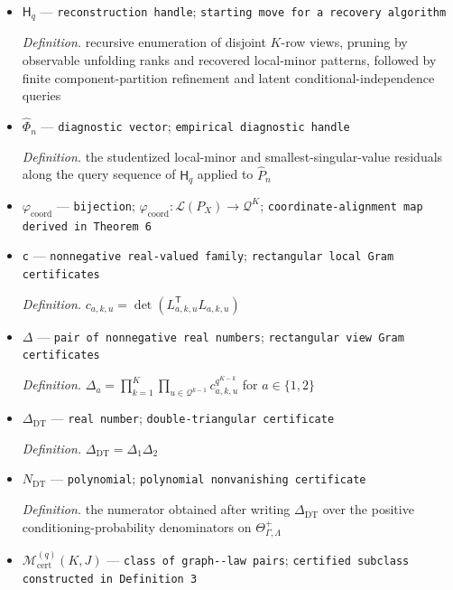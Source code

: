 \documentclass{article}
\begin{document}
\begin{itemize}
  \par\smallskip\noindent\emph{Definition.} \(d_{a,k,u}=\det(B_{a,k,u})\) when \(m_{s(a,k)}=q\)
  \item \(\mathsf H_q\) --- \texttt{reconstruction handle}; \texttt{starting move for a recovery algorithm}
  \par\smallskip\noindent\emph{Definition.} recursive enumeration of disjoint \(K\)-row views, pruning by observable unfolding ranks and recovered local-minor patterns, followed by finite component-partition refinement and latent conditional-independence queries
  \item \(\widehat\Phi_n\) --- \texttt{diagnostic vector}; \texttt{empirical diagnostic handle}
  \par\smallskip\noindent\emph{Definition.} the studentized local-minor and smallest-singular-value residuals along the query sequence of \(\mathsf H_q\) applied to \(\widehat P_n\)
  \item \(\varphi_{\mathrm{coord}}\) --- \texttt{bijection}; \(\varphi_{\mathrm{coord}}:\mathscr L(P_X)\to\mathcal Q^K\); \texttt{coordinate-\allowbreak{}alignment map derived in Theorem 6}
  \item \texttt{c} --- \texttt{nonnegative real-\allowbreak{}valued family}; \texttt{rectangular local Gram certificates}
  \par\smallskip\noindent\emph{Definition.} \(c_{a,k,u}=\det(L_{a,k,u}^{\mathsf T}L_{a,k,u})\)
  \item \(\Delta\) --- \texttt{pair of nonnegative real numbers}; \texttt{rectangular view Gram certificates}
  \par\smallskip\noindent\emph{Definition.} \(\Delta_a=\prod_{k=1}^K\prod_{u\in\mathcal Q^{k-1}}c_{a,k,u}^{q^{K-k}}\) for \(a\in\{1,2\}\)
  \item \(\Delta_{\mathrm{DT}}\) --- \texttt{real number}; \texttt{double-\allowbreak{}triangular certificate}
  \par\smallskip\noindent\emph{Definition.} \(\Delta_{\mathrm{DT}}=\Delta_1\Delta_2\)
  \item \(N_{\mathrm{DT}}\) --- \texttt{polynomial}; \texttt{polynomial nonvanishing certificate}
  \par\smallskip\noindent\emph{Definition.} the numerator obtained after writing \(\Delta_{\mathrm{DT}}\) over the positive conditioning-probability denominators on \(\Theta_{\Gamma,\Lambda}^{+}\)
  \item \(\mathcal M_{\mathrm{cert}}^{(q)}(K,J)\) --- \texttt{class of graph-\allowbreak{}-\allowbreak{}law pairs}; \texttt{certified subclass constructed in Definition 3}
\end{itemize}
\end{document}
